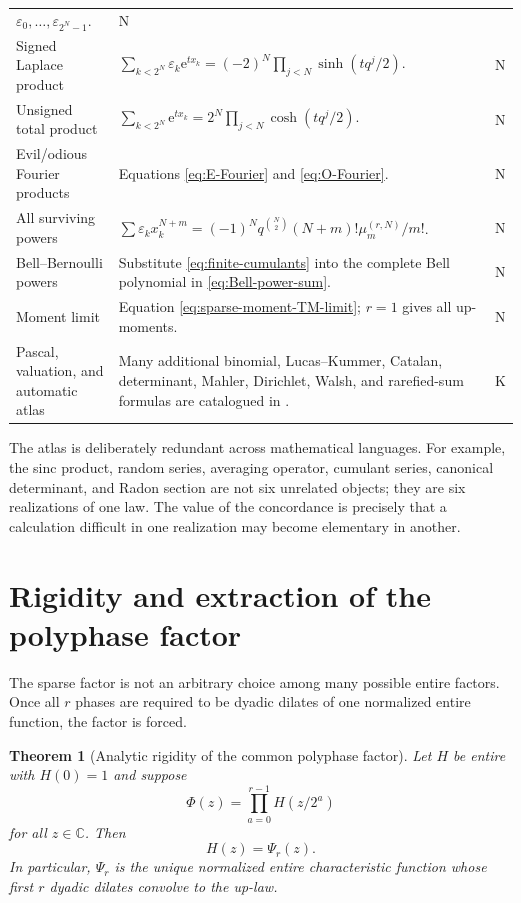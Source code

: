 \documentclass[11pt,oneside]{article}
\numberwithin{equation}{section}
\newtheorem{theorem}{Theorem}[section]
\theoremstyle{definition}
\theoremstyle{remark}
\newcommand{\C}{\mathbb C}
\newcommand{\e}{\mathrm e}
\newcommand{\eps}{\varepsilon}
\newcommand{\statusknown}{\textcolor{deepviolet}{\textsf{K}}}
\newcommand{\statusnew}{\textcolor{provedgreen}{\textsf{N}}}
\begin{document}
\begin{longtable}{@{}p{}p{}p{}@{}}
$\eps_0,\ldots,\eps_{2^N-1}$. & \statusnew\\
Signed Laplace product &
$\sum_{k<2^N}\eps_k\e^{tx_k}=(-2)^N\prod_{j<N}\sinh(tq^j/2)$. & \statusnew\\
Unsigned total product &
$\sum_{k<2^N}\e^{tx_k}=2^N\prod_{j<N}\cosh(tq^j/2)$. & \statusnew\\
Evil/odious Fourier products &
Equations \eqref{eq:E-Fourier} and \eqref{eq:O-Fourier}. & \statusnew\\
All surviving powers &
$\sum\eps_kx_k^{N+m}=(-1)^Nq^{\binom N2}(N+m)!\mu_m^{(r,N)}/m!$. & \statusnew\\
Bell--Bernoulli powers &
Substitute \eqref{eq:finite-cumulants} into the complete Bell polynomial in
\eqref{eq:Bell-power-sum}. & \statusnew\\
Moment limit &
Equation \eqref{eq:sparse-moment-TM-limit}; $r=1$ gives all up-moments. & \statusnew\\
Pascal, valuation, and automatic atlas &
Many additional binomial, Lucas--Kummer, Catalan, determinant, Mahler,
Dirichlet, Walsh, and rarefied-sum formulas are catalogued in \cite{repoAtlas}. & \statusknown\\
\bottomrule
\end{longtable}

\begin{statusbox}
The atlas is deliberately redundant across mathematical languages.  For
example, the sinc product, random series, averaging operator, cumulant series,
canonical determinant, and Radon section are not six unrelated objects; they
are six realizations of one law.  The value of the concordance is precisely
that a calculation difficult in one realization may become elementary in
another.
\end{statusbox}

\section{Rigidity and extraction of the polyphase factor}
\label{sec:rigidity}

The sparse factor is not an arbitrary choice among many possible entire
factors.  Once all $r$ phases are required to be dyadic dilates of one
normalized entire function, the factor is forced.

\begin{theorem}[Analytic rigidity of the common polyphase factor]
\label{thm:polyphase-rigidity}
Let $H$ be entire with $H(0)=1$ and suppose
\begin{equation}
 \Phi(z)=\prod_{a=0}^{r-1}H(z/2^a)                         \label{eq:H-factor-assumption}
\end{equation}
for all $z\in\C$.  Then
\begin{equation}
 H(z)=\Psi_r(z).                                           \label{eq:H-equals-Psi}
\end{equation}
In particular, $\Psi_r$ is the unique normalized entire characteristic
function whose first $r$ dyadic dilates convolve to the up-law.
\end{theorem}
\end{document}
